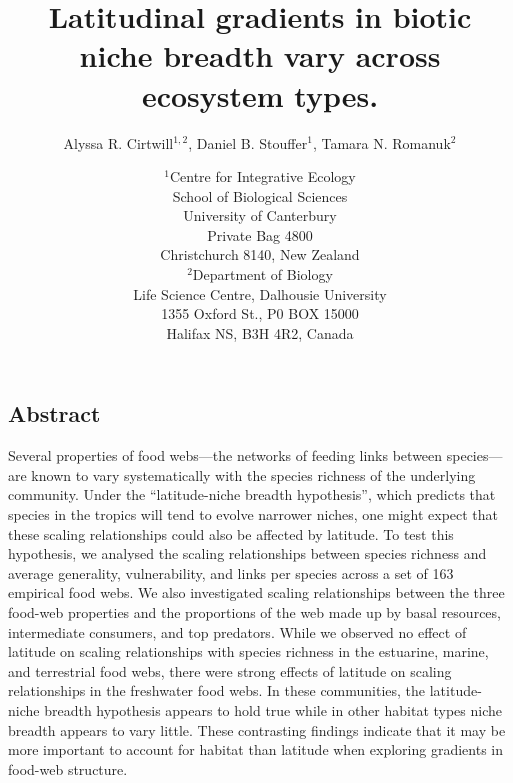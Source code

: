 \documentclass[12pt]{article}
\begin{document}
\title{Latitudinal gradients in biotic niche breadth vary across ecosystem types.}
\author{Alyssa R. Cirtwill$^{1,2}$, Daniel B. Stouffer$^{1}$, Tamara N. Romanuk$^{2}$}
\date{\small$^1$Centre for Integrative Ecology\\School of Biological Sciences\\University of Canterbury\\
Private Bag 4800\\Christchurch 8140, New Zealand \\
\medskip$^2$Department of Biology\\
Life Science Centre, Dalhousie University\\1355 Oxford St., P0 BOX 15000\\
Halifax NS, B3H 4R2, Canada\\}

\maketitle
\baselineskip=8.5mm
 
\vspace{-0.3 in}

\begin{spacing}{1.0}
\section*{Abstract}

Several properties of food webs---the networks of feeding links between
species---are known to vary systematically with the species richness of the underlying
community.  Under the ``latitude-niche breadth hypothesis'', which predicts
that species in the tropics will tend to evolve narrower niches, one might
expect that these scaling relationships could also be affected by latitude. To
test this hypothesis, we analysed the scaling relationships between species
richness and average generality, vulnerability, and links per species across a
set of 163 empirical food webs.  We also investigated scaling relationships
between the three food-web properties and the proportions of the web made up
by basal resources, intermediate consumers, and top predators. While we
observed no effect of latitude on scaling relationships with species richness
in the estuarine, marine, and terrestrial food webs, there were strong effects
of latitude on scaling relationships in the freshwater food webs. In these
communities, the latitude-niche breadth hypothesis appears to hold true while
in other habitat types niche breadth appears to vary little. These contrasting
findings indicate that it may be more important to account for habitat than
latitude when exploring gradients in food-web structure.

\end{spacing}
\end{document}
